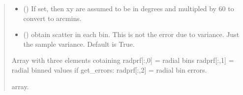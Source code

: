 \documentclass[letterpaper,10pt,english]{sphinxmanual}
\begin{document}
\begin{fulllineitems}
\begin{quote}
\begin{description}
\begin{itemize}
\item {} 
\sphinxAtStartPar
{} () \textendash{} If set, then xy are assumed to be in degrees and multipled by 60 to convert to arcmins.

\item {} 
\sphinxAtStartPar
{} () \textendash{} obtain scatter in each bin.
This is not the error due to variance. Just the sample variance.
Default is True.

\end{itemize}

\sphinxAtStartPar
{} \textendash{} Array with three elements cotaining
radprf{[}:,0{]} = radial bins
radprf{[}:,1{]} = radial binned values
if get\_errors:
radprf{[}:,2{]} = radial bin errors.

\sphinxAtStartPar
array.

\end{description}\end{quote}

\end{fulllineitems}

\end{document}
